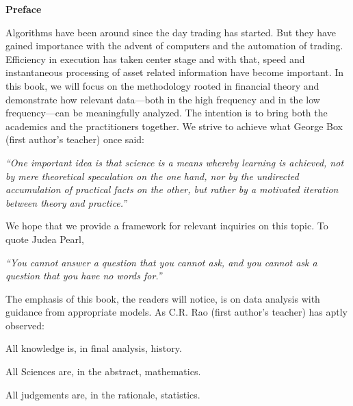 
\begin{center} {\Large\bfseries Preface} \end{center} \hspace*{\fill}

Algorithms have been around since the day trading has started. But they have gained importance with the advent of computers and the automation of trading. Efficiency in execution has taken center stage and with that, speed and instantaneous processing of asset related information have become important. In this book, we will focus on the methodology rooted in financial theory and demonstrate how relevant data---both in the high frequency and in the low frequency---can be meaningfully analyzed. The intention is to bring both the academics and the practitioners together. We strive to achieve what George Box (first author's teacher) once said: \par
        \begin{center}
        \begin{minipage}[t]{0.7\textwidth}
        	\raggedright
          	{\itshape``One important idea is that science is a means whereby learning is achieved, not by mere theoretical speculation on the one hand, nor by the undirected accumulation of practical facts on the other, but rather by a motivated iteration between theory and practice.''}
        \end{minipage} 
        \end{center}


We hope that we provide a framework for relevant inquiries on this topic. To quote Judea Pearl, \par
        \begin{center}
        \begin{minipage}[t]{0.7\textwidth}
        	\raggedright
          	{\itshape``You cannot answer a question that you cannot ask, and you cannot ask a question that you have no words for.''}
        \end{minipage} 
        \end{center}
The emphasis of this book, the readers will notice, is on data analysis with guidance from appropriate models. As C.R. Rao (first author's teacher) has aptly observed: \vspace{0.5\baselineskip}

\noindent All knowledge is, in final analysis, history. \par
\noindent All Sciences are, in the abstract, mathematics. \par
\noindent All judgements are, in the rationale, statistics. \twomedskip


